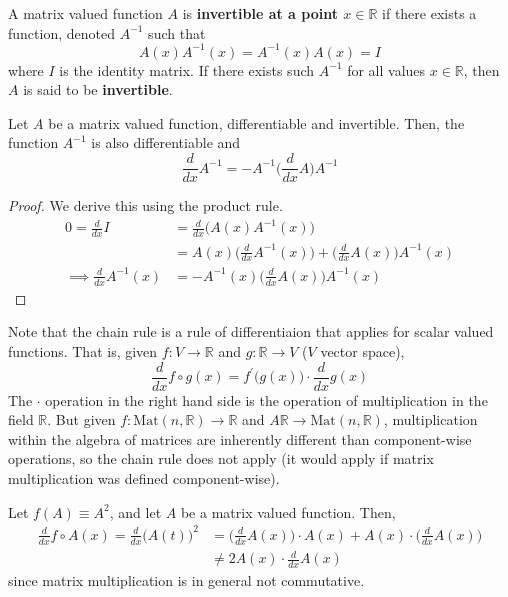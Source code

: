   \begin{definition}
    A matrix valued function $A$ is \textbf{invertible at a point $x \in \mathbb{R}$} if there exists a function, denoted $A^{-1}$ such that
    \begin{equation}
      A(x) A^{-1} (x) = A^{-1}(x) A(x) = I
    \end{equation}
    where $I$ is the identity matrix. If there exists such $A^{-1}$ for all values $x \in \mathbb{R}$, then $A$ is said to be \textbf{invertible}. 
  \end{definition}

  \begin{theorem}
    Let $A$ be a matrix valued function, differentiable and invertible. Then, the function $A^{-1}$ is also differentiable and 
    \begin{equation}
      \frac{d}{d x} A^{-1} = - A^{-1} \bigg( \frac{d}{d x} A \bigg) A^{-1}
    \end{equation}
  \end{theorem}
  \begin{proof}
    We derive this using the product rule. 
    \begin{align*}
      0 = \frac{d}{d x} I & = \frac{d}{d x} \big( A(x) A^{-1} (x) \big) \\
      & = A(x) \bigg(\frac{d}{d x} A^{-1} (x) \bigg) + \bigg( \frac{d}{d x} A(x) \bigg) A^{-1} (x) \\
      \implies \frac{d}{d x} A^{-1} (x) & = - A^{-1} (x) \bigg( \frac{d}{d x} A(x) \bigg) A^{-1}(x)
    \end{align*}
  \end{proof}
  Note that the chain rule is a rule of differentiaion that applies for scalar valued functions. That is, given $f: V \longrightarrow \mathbb{R}$ and $g: \mathbb{R} \longrightarrow V$ ($V$ vector space), 
  \begin{equation}
    \frac{d}{d x} f \circ g (x) = f^\prime \big( g(x) \big) \cdot \frac{d}{d x} g(x)
  \end{equation}
  The $\cdot$ operation in the right hand side is the operation of multiplication in the field $\mathbb{R}$. But given $f: \text{Mat}(n, \mathbb{R}) \longrightarrow \mathbb{R}$ and $A \mathbb{R} \longrightarrow \text{Mat}(n, \mathbb{R})$, multiplication within the algebra of matrices are inherently different than component-wise operations, so the chain rule does not apply (it would apply if matrix multiplication was defined component-wise). 

  \begin{example}
    Let $f(A) \equiv A^2$, and let $A$ be a matrix valued function. Then, 
    \begin{align*}
      \frac{d}{d x} f \circ A(x) = \frac{d}{d x} \big( A(t) \big)^2 & = \bigg( \frac{d}{d x} A(x) \bigg) \cdot A(x) + A(x) \cdot \bigg( \frac{d}{d x} A(x) \bigg) \\
      & \neq 2 A(x) \cdot \frac{d}{d x} A(x)
    \end{align*}
    since matrix multiplication is in general not commutative. 
  \end{example}

